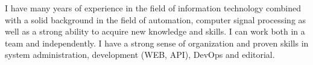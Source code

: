 
I have many years of experience in the field of information technology combined with 
a solid background in the field of automation, computer signal processing as well as 
a strong ability to acquire new knowledge and skills. 
\newline
I can work both in a team and independently. I have a strong sense of organization 
and proven skills in system administration, development (WEB, API), DevOps and editorial.